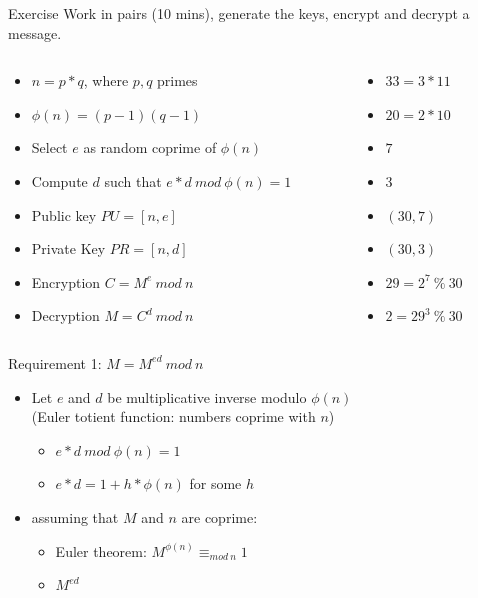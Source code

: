 \documentclass{beamer}
\begin{document}
\begin{frame}{Exercise}
Work in pairs (10 mins), generate the keys, encrypt and decrypt a message.
\begin{columns}
\begin{column}{0.70\textwidth}
  \begin{itemize}
    \item $n=p*q$, where $p,q$ primes 
    \item $\phi(n) = (p-1)(q-1)$
    \item Select $e$ as random coprime of $\phi(n)$
    \item Compute $d$ such that $e*d\ mod\ \phi(n) = 1$
    \item Public key $PU = [n,e]$ 
    \item Private Key $PR = [n,d]$
    \item Encryption $C = M^e\ mod\ n$
    \item Decryption $M = C^d\ mod\ n$
  \end{itemize}
\end{column}
\begin{column}{0.3\textwidth}  %
  \begin{itemize}
    \item$33=3*11$ 
    \item$20=2*10$
    \item$7$
    \item$3$
    \item$(30,7)$
    \item$(30,3)$
    \item$29=2^7\ \%\ 30$
    \item$2=29^3\ \%\ 30$
  \end{itemize}
\end{column}
\end{columns}
\end{frame}

\begin{frame}{Requirement 1: $M = M^{ed}\ mod\ n$}
  \begin{itemize}
    \item Let $e$ and $d$ be multiplicative inverse modulo $\phi(n)$\\
      (Euler totient function: numbers coprime with $n$)
      \begin{itemize}
      \item<2-> $e*d\ mod\ \phi(n) = 1$
      \item<3-> $e*d = 1 + h*\phi(n)$ for some $h$
      \end{itemize}
    \item<4-> assuming that $M$ and $n$ are coprime:
      \begin{itemize}
      \item<5-> Euler theorem: $M^{\phi(n)} \equiv_{mod\ n} 1$
      \item<6-> $M^{ed} $
      \end{itemize}
  \end{itemize}
\end{frame}
\end{document}
